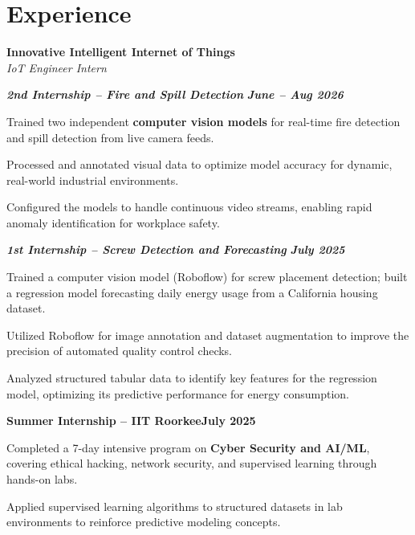 \documentclass[letterpaper,10pt]{article}
\newcommand{\heading}[2]{
  \hspace{10pt}#1\hfill#2\\
}
\newcommand{\headingBf}[2]{
  \heading{\textbf{#1}}{\textbf{#2}}
}
\newcommand{\headingIt}[2]{
  \heading{\textit{#1}}{\textit{#2}}
}
\newenvironment{resume_list}{
  \vspace{-7pt}
  \begin{itemize}[itemsep=-2px, parsep=1pt, leftmargin=30pt]
}{
  \end{itemize}
}
\begin{document}
\section{Experience}
  \headingBf{Innovative Intelligent Internet of Things}{}
  \headingIt{IoT Engineer Intern}{}
  \begin{resume_list}
    \item[] \textbf{\textit{2nd Internship -- Fire and Spill Detection}} \hfill \textbf{\textit{June -- Aug 2026}}\vspace{4pt}
    \item Trained two independent \textbf{computer vision models} for real-time fire detection and spill detection from live camera feeds.
    \item Processed and annotated visual data to optimize model accuracy for dynamic, real-world industrial environments.
    \item Configured the models to handle continuous video streams, enabling rapid anomaly identification for workplace safety.
    \vspace{3pt}
    \item[] \textbf{\textit{1st Internship -- Screw Detection and Forecasting}} \hfill \textbf{\textit{July 2025}}\vspace{4pt}
    \item Trained a computer vision model (Roboflow) for screw placement detection; built a regression model forecasting daily energy usage from a California housing dataset.
    \item Utilized Roboflow for image annotation and dataset augmentation to improve the precision of automated quality control checks.
    \item Analyzed structured tabular data to identify key features for the regression model, optimizing its predictive performance for energy consumption.
  \end{resume_list}
  \headingBf{Summer Internship -- IIT Roorkee}{July 2025}
  \begin{resume_list}
    \item Completed a 7-day intensive program on \textbf{Cyber Security and AI/ML}, covering ethical hacking, network security, and supervised learning through hands-on labs.
    \item Applied supervised learning algorithms to structured datasets in lab environments to reinforce predictive modeling concepts.
  \end{resume_list}
\end{document}
